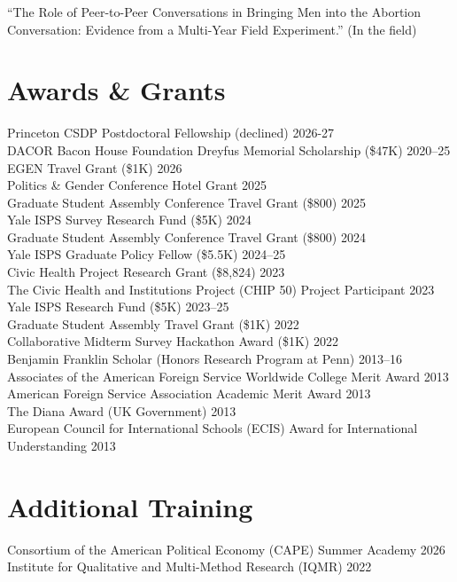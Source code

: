 \documentclass[11pt]{article}
\begin{document}
“The Role of Peer-to-Peer Conversations in Bringing Men into the Abortion Conversation: Evidence from a Multi-Year Field Experiment.” (In the field)

\section*{Awards \& Grants}
Princeton CSDP Postdoctoral Fellowship (declined) \hfill 2026-27 \\
DACOR Bacon House Foundation Dreyfus Memorial Scholarship (\$47K) \hfill 2020--25 \\
EGEN Travel Grant (\$1K) \hfill 2026 \\
Politics \& Gender Conference Hotel Grant \hfill 2025 \\
Graduate Student Assembly Conference Travel Grant (\$800) \hfill 2025 \\
Yale ISPS Survey Research Fund (\$5K) \hfill 2024 \\
Graduate Student Assembly Conference Travel Grant (\$800) \hfill 2024 \\
Yale ISPS Graduate Policy Fellow (\$5.5K) \hfill 2024--25 \\
Civic Health Project Research Grant (\$8,824) \hfill 2023 \\
The Civic Health and Institutions Project (CHIP 50) Project Participant \hfill 2023 \\
Yale ISPS Research Fund (\$5K) \hfill 2023--25 \\
Graduate Student Assembly Travel Grant (\$1K) \hfill 2022 \\
Collaborative Midterm Survey Hackathon Award (\$1K) \hfill 2022 \\
Benjamin Franklin Scholar (Honors Research Program at Penn) \hfill 2013--16 \\
Associates of the American Foreign Service Worldwide College Merit Award \hfill 2013 \\
American Foreign Service Association Academic Merit Award \hfill 2013 \\
The Diana Award (UK Government) \hfill 2013 \\
European Council for International Schools (ECIS) Award for International Understanding \hfill 2013

\section*{Additional Training}
Consortium of the American Political Economy (CAPE) Summer Academy \hfill 2026 \\
Institute for Qualitative and Multi-Method Research (IQMR) \hfill 2022 \\
\end{document}
